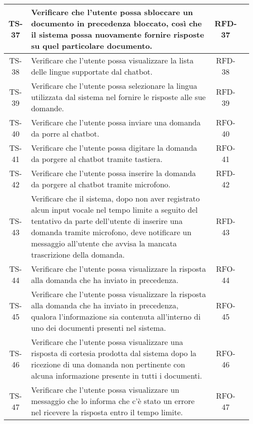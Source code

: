 \begin{xltabular}{\textwidth}{| c | X | c | c |}
    \hline
    TS-37 & Verificare che l'utente possa sbloccare un documento in precedenza bloccato, così che il sistema possa nuovamente fornire risposte su quel particolare documento. & RFD-37 & \textcolor{xmarkcolor}{} \\
    \hline
    TS-38 & Verificare che l’utente possa visualizzare la lista delle lingue supportate dal chatbot. & RFD-38 & \textcolor{xmarkcolor}{} \\
    \hline
    TS-39 &  Verificare che l'utente possa selezionare la lingua utilizzata dal sistema nel fornire le risposte alle sue domande. & RFD-39 & \textcolor{xmarkcolor}{} \\
    \hline
    TS-40 & Verificare che l'utente possa inviare una domanda da porre al chatbot. & RFO-40 & \textcolor{xmarkcolor}{} \\
    \hline
    TS-41 & Verificare che l'utente possa digitare la domanda da porgere al chatbot tramite tastiera. & RFO-41 & \textcolor{xmarkcolor}{} \\
    \hline
    TS-42 & Verificare che l’utente possa inserire la domanda da porgere al chatbot tramite microfono. & RFD-42 & \textcolor{xmarkcolor}{} \\
    \hline
    TS-43 & Verificare che il sistema, dopo non aver registrato alcun input vocale nel tempo limite a seguito del tentativo da parte dell'utente di inserire una domanda tramite microfono, deve notificare un messaggio all'utente che avvisa la mancata trascrizione della domanda. & RFD-43 & \textcolor{xmarkcolor}{} \\
    \hline
    TS-44 & Verificare che l’utente possa visualizzare la risposta alla domanda che ha inviato in precedenza. &  RFO-44 & \textcolor{xmarkcolor}{} \\
    \hline
    TS-45 & Verificare che l’utente possa visualizzare la risposta alla domanda che ha inviato in precedenza, qualora l'informazione sia contenuta all'interno di uno dei documenti presenti nel sistema. &  RFO-45 & \textcolor{xmarkcolor}{} \\
    \hline
    TS-46 & Verificare che l’utente possa visualizzare una risposta di cortesia prodotta dal sistema dopo la ricezione di una domanda non pertinente con alcuna informazione presente in tutti i documenti. & RFO-46 & \textcolor{xmarkcolor}{} \\
    \hline
    TS-47 & Verificare che l'utente possa visualizzare un messaggio che lo informa che c'è stato un errore nel ricevere la risposta entro il tempo limite. & RFO-47 & \textcolor{xmarkcolor}{} \\

\end{xltabular}
